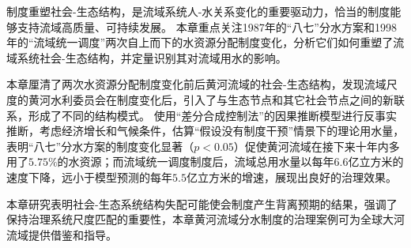 制度重塑社会-生态结构，是流域系统人-水关系变化的重要驱动力，恰当的制度能够支持流域高质量、可持续发展。
本章重点关注1987年的``八七''分水方案和1998年的“流域统一调度”两次自上而下的水资源分配制度变化，分析它们如何重塑了流域系统社会-生态结构，并定量识别其对流域用水的影响。

本章厘清了两次水资源分配制度变化前后黄河流域的社会-生态结构，发现流域尺度的黄河水利委员会在制度变化后，引入了与生态节点和其它社会节点之间的新联系，形成了不同的结构模式。
使用“差分合成控制法”的因果推断模型进行反事实推断，考虑经济增长和气候条件，估算“假设没有制度干预”情景下的理论用水量，表明``八七''分水方案的制度变化显著（$p<0.05$）促使黄河流域在接下来十年内多用了$5.75\%$的水资源；而流域统一调度制度后，流域总用水量以每年$6.6$亿立方米的速度下降，远小于模型预测的每年$5.5$亿立方米的增速，展现出良好的治理效果。

本章研究表明社会-生态系统结构失配可能使会制度产生背离预期的结果，强调了保持治理系统尺度匹配的重要性，本章黄河流域分水制度的治理案例可为全球大河流域提供借鉴和指导。
